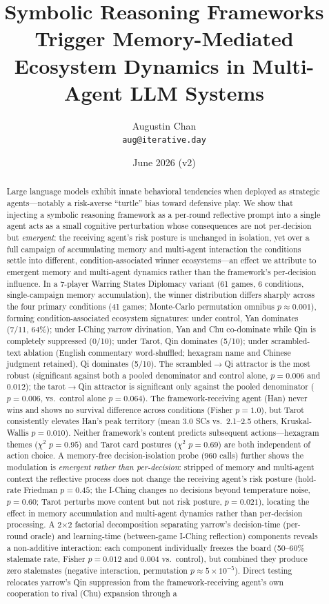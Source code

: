 \documentclass[11pt]{article}
\title{Symbolic Reasoning Frameworks Trigger Memory-Mediated\\
\large Ecosystem Dynamics in Multi-Agent LLM Systems}
\author{Augustin Chan\\
\texttt{aug@iterative.day}}
\date{June 2026 (v2)}
\begin{document}
\maketitle

\begin{abstract}
Large language models exhibit innate behavioral tendencies when deployed as strategic agents---notably a risk-averse ``turtle'' bias toward defensive play. We show that injecting a symbolic reasoning framework as a per-round reflective prompt into a single agent acts as a small cognitive perturbation whose consequences are not per-decision but \emph{emergent}: the receiving agent's risk posture is unchanged in isolation, yet over a full campaign of accumulating memory and multi-agent interaction the conditions settle into different, condition-associated winner ecosystems---an effect we attribute to emergent memory and multi-agent dynamics rather than the framework's per-decision influence. In a 7-player Warring States Diplomacy variant (61 games, 6 conditions, single-campaign memory accumulation), the winner distribution differs sharply across the four primary conditions (41 games; Monte-Carlo permutation omnibus $p \approx 0.001$), forming condition-associated ecosystem signatures: under control, Yan dominates (7/11, 64\%); under I-Ching yarrow divination, Yan and Chu co-dominate while Qin is completely suppressed (0/10); under Tarot, Qin dominates (5/10); under scrambled-text ablation (English commentary word-shuffled; hexagram name and Chinese judgment retained), Qi dominates (5/10). The scrambled$\to$Qi attractor is the most robust (significant against both a pooled denominator and control alone, $p = 0.006$ and $0.012$); the tarot$\to$Qin attractor is significant only against the pooled denominator ($p = 0.006$, vs.\ control alone $p = 0.064$). The framework-receiving agent (Han) never wins and shows no survival difference across conditions (Fisher $p = 1.0$), but Tarot consistently elevates Han's peak territory (mean 3.0 SCs vs.\ 2.1--2.5 others, Kruskal-Wallis $p = 0.010$). Neither framework's content predicts subsequent actions---hexagram themes ($\chi^2$ $p = 0.95$) and Tarot card postures ($\chi^2$ $p = 0.69$) are both independent of action choice. A memory-free decision-isolation probe (960 calls) further shows the modulation is \emph{emergent rather than per-decision}: stripped of memory and multi-agent context the reflective process does not change the receiving agent's risk posture (hold-rate Friedman $p = 0.45$; the I-Ching changes no decisions beyond temperature noise, $p = 0.60$; Tarot perturbs move content but not risk posture, $p = 0.021$), locating the effect in memory accumulation and multi-agent dynamics rather than per-decision processing. A 2$\times$2 factorial decomposition separating yarrow's decision-time (per-round oracle) and learning-time (between-game I-Ching reflection) components reveals a non-additive interaction: each component individually freezes the board (50--60\% stalemate rate, Fisher $p = 0.012$ and $0.004$ vs.\ control), but combined they produce zero stalemates (negative interaction, permutation $p \approx 5\times10^{-5}$). Direct testing relocates yarrow's Qin suppression from the framework-receiving agent's own cooperation to rival (Chu) expansion through a 
\end{abstract}
\end{document}
